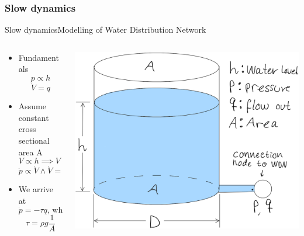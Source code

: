 \subsubsection{Slow dynamics}

\begin{frame}{Slow dynamics}{Modelling of Water Distribution Network}
	\begin{columns}
		\begin{column}{.5\textwidth}
			\begin{itemize}
				\item Fundamentals
				\begin{equation*}
					p \propto h 
				\end{equation*}
				\begin{equation*}
					\dot{V} = q
				\end{equation*}
				\item Assume constant cross sectional area A
				\begin{equation*}
					V \propto h \implies V \propto p 
				\end{equation*}
				\begin{equation*}
					\dot{p} \propto \dot{V} \wedge \dot{V} = q \implies \dot{p} \propto q
				\end{equation*}
				\item We arrive at
				\begin{equation*}
					\dot{p} = -\tau q \text{,  where}
				\end{equation*}	
				\begin{equation*}
					\tau = \rho g \frac{1}{A}
				\end{equation*}	
			\end{itemize}
		\end{column}
		\begin{column}{.5\textwidth}\raggedleft
			\includegraphics[width=1\linewidth]{Topics/SlowDynamicsLinearisation/Graphics/Tank_sketch.png}
		\end{column}
	\end{columns}
\end{frame}

